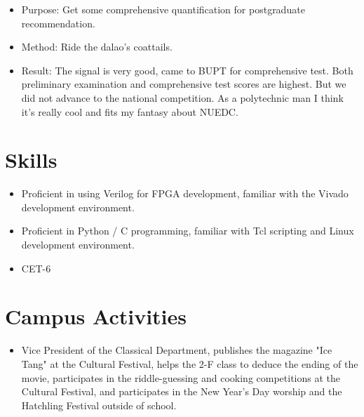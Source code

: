 \documentclass{resume}
\begin{document}
\begin{itemize}
  \item Purpose: Get some comprehensive quantification for postgraduate recommendation.
  \item Method: Ride the dalao's coattails.
  \item Result: The signal is very good, came to BUPT for comprehensive test. Both preliminary examination and comprehensive test scores are highest. But we did not advance to the national competition. As a polytechnic man I think it's really cool and fits my fantasy about NUEDC.
\end{itemize}

\section{\texorpdfstring{\faCogs}{} Skills}
\begin{itemize}[parsep=0.5ex]
  \item Proficient in using Verilog for FPGA development, familiar with the Vivado development environment.
  \item Proficient in Python / C programming, familiar with Tcl scripting and Linux development environment.
  \item CET-6
\end{itemize}

\section{\texorpdfstring{\faInfo}{} Campus Activities}
\begin{itemize}[parsep=0.5ex]
  \item Vice President of the Classical Department, publishes the magazine "Ice Tang" at the Cultural Festival, helps the 2-F class to deduce the ending of the movie, participates in the riddle-guessing and cooking competitions at the Cultural Festival, and participates in the New Year's Day worship and the Hatchling Festival outside of school.
\end{itemize}
\end{document}
